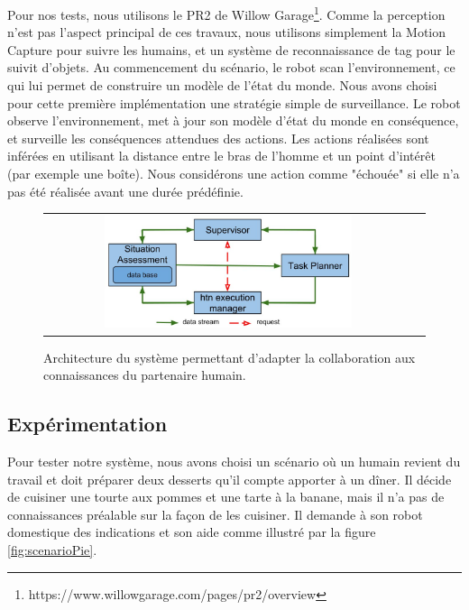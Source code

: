\documentclass[a4paper,11pt,twoside]{StyleThese}
\begin{document}
Pour nos tests, nous utilisons le PR2 de Willow Garage\footnote{https://www.willowgarage.com/pages/pr2/overview}. Comme la perception n'est pas l'aspect principal de ces travaux, nous utilisons simplement la Motion Capture pour suivre les humains, et un système de reconnaissance de tag pour le suivit d'objets.
Au commencement du scénario, le robot scan l'environnement, ce qui lui permet de construire un modèle de l'état du monde.
Nous avons choisi pour cette première implémentation une stratégie simple de surveillance. Le robot observe l'environnement, met à jour son modèle d'état du monde en conséquence, et surveille les conséquences attendues des actions. Les actions réalisées sont inférées en utilisant la distance entre le bras de l'homme et un point d'intérêt (par exemple une boîte). Nous considérons une action comme "échouée" si elle n'a pas été réalisée avant une durée prédéfinie.

%
%
%
\begin{figure}[ht!]

 \centering
 \begin{tabular}{cc}
  \includegraphics[width=0.69\textwidth]{img/archi.jpg}
 \end{tabular}
 \caption{Architecture du système permettant d'adapter la collaboration aux connaissances du partenaire humain.}
 \label{fig:architecture}
 \end{figure}
 
 \subsection{Expérimentation}
 \label{sec:experiment}
Pour tester notre système, nous avons choisi un scénario où un humain revient du travail et doit préparer deux desserts qu'il compte apporter à un dîner. Il décide de cuisiner une tourte aux pommes et une tarte à la banane, mais il n'a pas de connaissances préalable sur la façon de les cuisiner. Il demande à son robot domestique des indications et son aide comme illustré par la figure \ref{fig:scenarioPie}.
\end{document}
